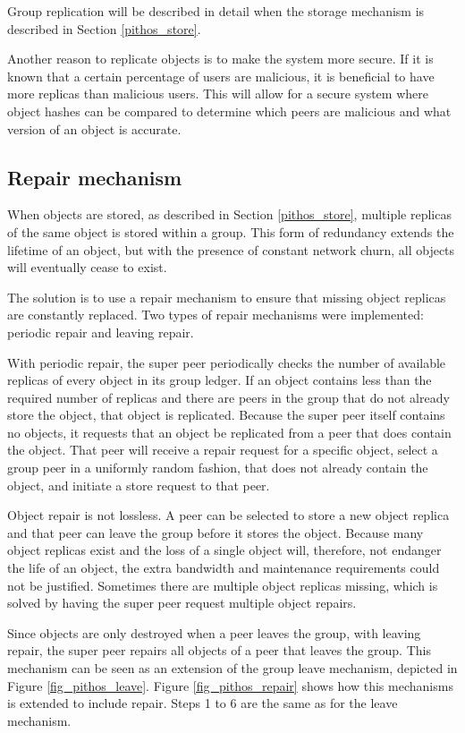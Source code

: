 Group replication will be described in detail when the storage mechanism is described in Section \ref{pithos_store}.

Another reason to replicate objects is to make the system more secure. If it is known that a certain percentage of users are malicious, it is beneficial to have more replicas than malicious users. This will allow for a secure system where object hashes can be compared to determine which peers are malicious and what version of an object is accurate.

\subsection{Repair mechanism}

When objects are stored, as described in Section \ref{pithos_store}, multiple replicas of the same object is stored within a group. This form of redundancy extends the lifetime of an object, but with the presence of constant network churn, all objects will eventually cease to exist.

The solution is to use a repair mechanism to ensure that missing object replicas are constantly replaced. Two types of repair mechanisms were implemented: periodic repair and leaving repair.

With periodic repair, the super peer periodically checks the number of available replicas of every object in its group ledger. If an object contains less than the required number of replicas and there are peers in the group that do not already store the object, that object is replicated. Because the super peer itself contains no objects, it requests that an object be replicated from a peer that does contain the object. That peer will receive a repair request for a specific object, select a group peer in a uniformly random fashion, that does not already contain the object, and initiate a store request to that peer.

Object repair is not lossless. A peer can be selected to store a new object replica and that peer can leave the group before it stores the object. Because many object replicas exist and the loss of a single object will, therefore, not endanger the life of an object, the extra bandwidth and maintenance requirements could not be justified. Sometimes there are multiple object replicas missing, which is solved by having the super peer request multiple object repairs.

Since objects are only destroyed when a peer leaves the group, with leaving repair, the super peer repairs all objects of a peer that leaves the group. This mechanism can be seen as an extension of the group leave mechanism, depicted in Figure \ref{fig_pithos_leave}. Figure \ref{fig_pithos_repair} shows how this mechanisms is extended to include repair. Steps 1 to 6 are the same as for the leave mechanism.

